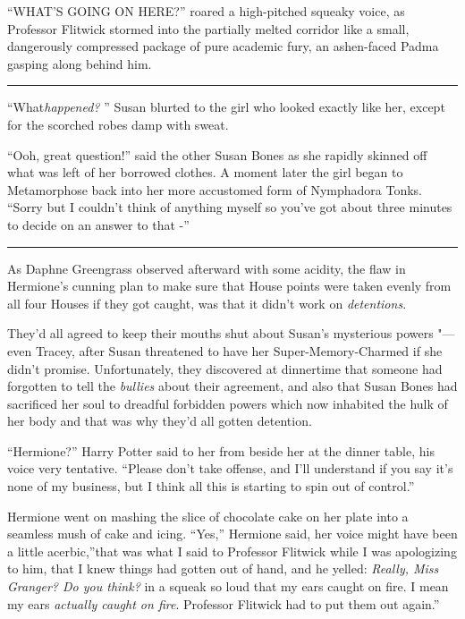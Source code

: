 ``WHAT'S GOING ON HERE?'' roared a high-pitched squeaky voice, as
Professor Flitwick stormed into the partially melted corridor like a
small, dangerously compressed package of pure academic fury, an
ashen-faced Padma gasping along behind him.

\begin{center}\rule{3in}{0.4pt}\end{center}

``What\emph{happened?} '' Susan blurted to the girl who looked exactly
like her, except for the scorched robes damp with sweat.

``Ooh, great question!'' said the other Susan Bones as she rapidly
skinned off what was left of her borrowed clothes. A moment later the
girl began to Metamorphose back into her more accustomed form of
Nymphadora Tonks. ``Sorry but I couldn't think of anything myself so
you've got about three minutes to decide on an answer to that -''

\begin{center}\rule{3in}{0.4pt}\end{center}

As Daphne Greengrass observed afterward with some acidity, the flaw in
Hermione's cunning plan to make sure that House points were taken evenly
from all four Houses if they got caught, was that it didn't work on
\emph{detentions}.

They'd all agreed to keep their mouths shut about Susan's mysterious
powers "--- even Tracey, after Susan threatened to have her
Super-Memory-Charmed if she didn't promise. Unfortunately, they
discovered at dinnertime that someone had forgotten to tell the
\emph{bullies} about their agreement, and also that Susan Bones had
sacrificed her soul to dreadful forbidden powers which now inhabited the
hulk of her body and that was why they'd all gotten detention.

``Hermione?'' Harry Potter said to her from beside her at the dinner
table, his voice very tentative. ``Please don't take offense, and I'll
understand if you say it's none of my business, but I think all this is
starting to spin out of control.''

Hermione went on mashing the slice of chocolate cake on her plate into a
seamless mush of cake and icing. ``Yes,'' Hermione said, her voice might
have been a little acerbic,''that was what I said to Professor Flitwick
while I was apologizing to him, that I knew things had gotten out of
hand, and he yelled: \emph{Really, Miss Granger? Do you think?} in a
squeak so loud that my ears caught on fire. I mean my ears
\emph{actually caught on fire}. Professor Flitwick had to put them out
again.''

